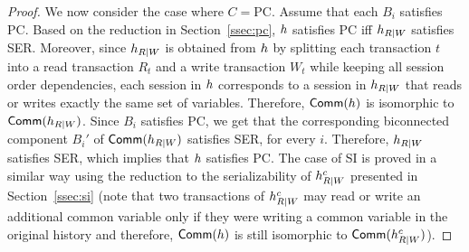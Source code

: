 \begin{proof}
We now consider the case where $C=\text{PC}$. Assume that each $B_i$ satisfies PC. Based on the reduction in Section~\ref{ssec:pc}, ${h}$ satisfies PC iff ${h}_{R|W}$ satisfies SER. Moreover, since ${h}_{R|W}$ is obtained from ${h}$ by splitting each transaction $t$ into a read transaction $R_t$ and a write transaction $W_t$ while keeping all session order dependencies, each session in ${h}$ corresponds to a session in ${h}_{R|W}$ that reads or writes exactly the same set of variables. Therefore, $\mathsf{Comm}({h})$ is isomorphic to $\mathsf{Comm}({h}_{R|W})$. Since $B_i$ satisfies PC, we get that the corresponding biconnected component $B_i'$ of $\mathsf{Comm}({h}_{R|W})$ satisfies SER, for every $i$. Therefore, ${h}_{R|W}$ satisfies SER, which implies that ${h}$ satisfies PC. The case of SI is proved in a similar way using the reduction to the serializability of ${h}_{R|W}^c$ presented in Section~\ref{ssec:si} (note that two transactions of ${h}_{R|W}^c$ may read or write an additional common variable only if they were writing a common variable in the original history and therefore, $\mathsf{Comm}({h})$ is still isomorphic to $\mathsf{Comm}({h}_{R|W}^c)$).
%
\end{proof}
%
%
%
